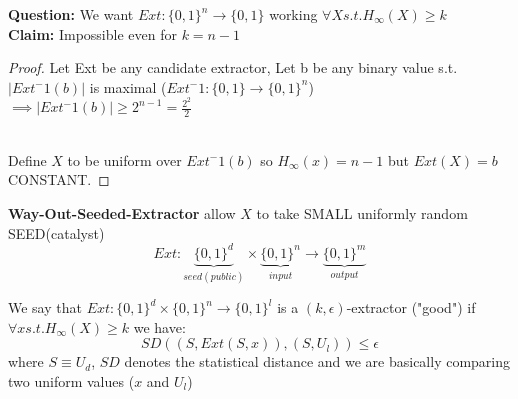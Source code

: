 \textbf{Question: }We want $Ext:\{0,1\}^n \to \{0,1\}$ working $\forall X s.t. H_{\infty}(X)\geq k$\\
\textbf{Claim: } Impossible even for $k=n-1$
\begin{proof}
    Let Ext be any candidate extractor, Let b be any binary value s.t. $|Ext^-1(b)|$ is maximal ($Ext^-1: \{0,1\} \to \{0,1\}^n$)\\
    $\implies |Ext^-1(b)|\geq 2^{n-1}=\frac{2^2}{2}$

    \\
    \bigskip
    Define $X$ to be uniform over $Ext^-1(b)$ so $H_{\infty}(x)=n-1$ but $Ext(X)=b$ CONSTANT.
\end{proof}

\begin{theorem}
    \textbf{Way-Out-Seeded-Extractor} allow $X$ to take SMALL uniformly random SEED(catalyst)\\
    $$Ext: \underbrace{\{0,1\}^d}_{seed(public)}\times \underbrace{\{0,1\}^n}_{input} \to \underbrace{\{0,1\}^m}_{output}$$
\end{theorem}
\begin{definition}
    We say that $Ext:\{0,1\}^d \times \{0,1\}^n \to \{0,1\}^l$ is a $(k,\epsilon)$-extractor ("good") if $\forall x s.t. H_{\infty}(X)\geq k$ we have:
    $$SD((S,Ext(S,x)),(S,U_l))\leq \epsilon$$ 
    where $S\equiv U_d$, $SD$ denotes the statistical distance and we are basically comparing two uniform values ($x$ and $U_l$) 
\end{definition}

